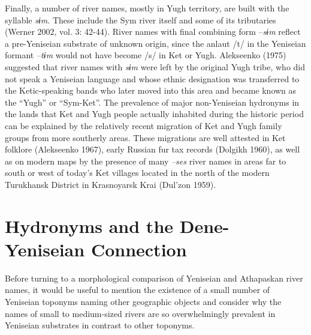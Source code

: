 Finally, a number of river names, mostly in Yugh territory, are built with the syllable \textit{sɨm}. These include the Sym river itself and some of its tributaries (Werner 2002, vol. 3: 42-44). River names with final combining form –\textit{sɨm} reflect a pre-Yeniseian substrate of unknown origin, since the anlaut /t/ in the Yeniseian formant\textit{ –tɨm} would not have become /s/ in Ket or Yugh. Alekseenko (1975) suggested that river names with \textit{sɨm} were left by the original Yugh tribe, who did not speak a Yeniseian language and whose ethnic designation was transferred to the Ketic-speaking bands who later moved into this area and became known as the “Yugh” or “Sym-Ket”. The prevalence of major non-Yeniseian hydronyms in the lands that Ket and Yugh people actually inhabited during the historic period can be explained by the relatively recent migration of Ket and Yugh family groups from more southerly areas. These migrations are well attested in Ket folklore (Alekseenko 1967), early Russian fur tax records (Dolgikh 1960), as well as on modern maps by the presence of many \textit{–ses} river names in areas far to south or west of today’s Ket villages located in the north of the modern Turukhansk District in Krasnoyarsk Krai (Dul’zon 1959).


\section{Hydronyms and the Dene-Yeniseian Connection}\label{vajda:sec:3}

Before turning to a morphological comparison of Yeniseian and Athapaskan river names, it would be useful to mention the existence of a small number of Yeniseian toponyms naming other geographic objects and consider why the names of small to medium-sized rivers are so overwhelmingly prevalent in Yeniseian substrates in contrast to other toponyms.

